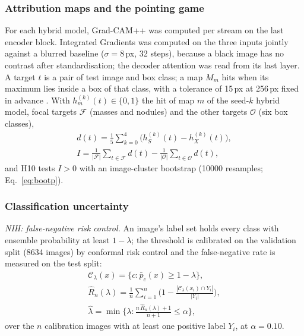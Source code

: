 \subsubsection{Attribution maps and the pointing game}
\label{sec:m-xai}
For each hybrid model, Grad-CAM++ \cite{chattopadhay2018gradcampp} was computed per stream on the last encoder block. Integrated Gradients
\cite{sundararajan2017axiomatic} was computed on the three inputs jointly against a blurred baseline ($\sigma=8$\,px, 32 steps), because a
black image has no contrast after standardisation; the decoder attention was read from its last layer. A target $t$ is a pair of test image
and box class; a map $M_m$ hits when its maximum lies inside a box of that class, with a tolerance of 15\,px at 256\,px fixed in advance
\cite{zhang2018topdown}. With $h^{(k)}_m(t)\in\{0,1\}$ the hit of map $m$ of the seed-$k$ hybrid model, focal targets $\mathcal{F}$
(masses and nodules) and the other targets $\mathcal{O}$ (six box classes),
\begin{equation}
\begin{gathered}
d(t)=\frac15\sum_{k=0}^{4}\big(h^{(k)}_{S}(t)-h^{(k)}_{X}(t)\big),\\
I=\frac{1}{|\mathcal{F}|}\sum_{t\in\mathcal{F}}d(t)-\frac{1}{|\mathcal{O}|}\sum_{t\in\mathcal{O}}d(t),
\end{gathered}
\label{eq:pointing}
\end{equation}
and H10 tests $I>0$ with an image-cluster bootstrap (\num{10000} resamples; Eq.~\eqref{eq:bootp}).

\subsubsection{Classification uncertainty}
\label{sec:m-clsuq}
\emph{NIH: false-negative risk control.} An image's label set holds every class with ensemble probability at least $1-\lambda$; the threshold
is calibrated on the validation split (\num{8634} images) by conformal risk control \cite{angelopoulos2022crc} and the false-negative rate is
measured on the test split:
\begin{equation}
\begin{gathered}
\mathcal{C}_\lambda(x)=\{c:\bar p_c(x)\ge1-\lambda\},\\
\hat R_n(\lambda)=\frac1n\sum_{i=1}^{n}\Big(1-\frac{|\mathcal{C}_\lambda(x_i)\cap Y_i|}{|Y_i|}\Big),\\
\hat\lambda=\min\Big\{\lambda:\frac{n\,\hat R_n(\lambda)+1}{n+1}\le\alpha\Big\},
\end{gathered}
\label{eq:crc}
\end{equation}
over the $n$ calibration images with at least one positive label $Y_i$, at $\alpha=0.10$.


